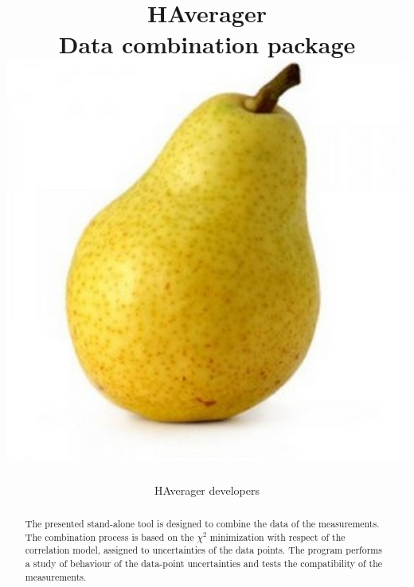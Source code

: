 \documentclass[11pt,twoside,a4paper]{article}
\title{ \vspace{1cm} {\Huge HAverager } \\
              Data combination package  \\ 
              \vspace{0.5cm}
\includegraphics[width=0.25\linewidth]{figures/logo.jpg}}
\author{HAverager developers}
\begin{document}
\maketitle
\vspace{4cm}
\begin{abstract}
\vspace{0.5cm}
The presented stand-alone tool is designed to combine the data of the measurements. The combination process is based on the $\chi^2$ minimization with respect of the correlation model, assigned to uncertainties of the data points. The program performs a study of behaviour of the data-point uncertainties and tests the compatibility of the measurements. 
\end{abstract}
\thispagestyle{empty}
\newpage
\tableofcontents
\linenumbers
\newpage


  






\end{document}
